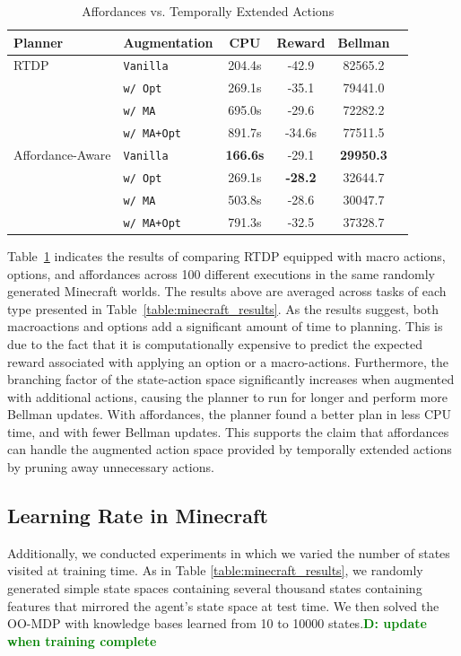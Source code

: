 \documentclass[conference]{IEEEtran}
\newcommand{\dnote}[1]{\textcolor{Green}{\textbf{D: #1}}}
\begin{document}
\begin{table}[H]
\centering
\caption{Affordances vs. Temporally Extended Actions}
\begin{tabular}{ l l  | c c c c}
  Planner & Augmentation 					&	CPU	&	Reward 	& Bellman \\ \hline
RTDP &  \texttt{Vanilla}  			&	204.4s	&	-42.9		&	82565.2		\\
 & \texttt{w/ Opt}  				&	269.1s	&	-35.1		&	79441.0		\\
 &\texttt{w/ MA}  				&	695.0s	&	-29.6		&	72282.2		\\
 &\texttt{w/ MA+Opt}  			&	891.7s	&	-34.6s	&	77511.5		\\ \hline
 Affordance-Aware &\texttt{Vanilla}  	& 	{\bf 166.6s}&	-29.1		&	{\bf 29950.3}		\\
  &\texttt{w/ Opt}  				& 	269.1s	&	{\bf -28.2}	&	32644.7		\\
  &\texttt{w/ MA}  				& 	503.8s	&	-28.6		&	30047.7		\\
  &\texttt{w/ MA+Opt}  			& 	791.3s	&	-32.5		&	37328.7		\\
\end{tabular}
\label{table:temp_ext_act_results}
\end{table}

Table~\ref{table:temp_ext_act_results} indicates the results of comparing RTDP
equipped with macro actions, options, and affordances across 100 different executions
in the same randomly generated Minecraft worlds. The results above are averaged across tasks of
each type presented in Table~\ref{table:minecraft_results}. As the results 
suggest, both macroactions and options add a significant amount of time to planning.
This is due to the fact that it is computationally expensive to predict the expected reward
associated with applying an option or a macro-actions. Furthermore, the branching factor of the
state-action space significantly increases when augmented with additional actions, causing the
planner to run for longer and perform more Bellman updates. With affordances, the planner found a better plan
in less CPU time, and with fewer Bellman updates. This supports the claim that affordances can handle the augmented 
action space provided by temporally extended actions by pruning away unnecessary actions.

\subsection{Learning Rate in Minecraft}
Additionally, we conducted experiments in which we varied the number of states visited at training time. 
As in Table \ref{table:minecraft_results}, we randomly generated simple state spaces
containing several thousand states containing features that mirrored the agent's state
space at test time. We then solved the OO-MDP with knowledge bases learned from 
10 to 10000 states.\dnote{update when training complete}
\end{document}
